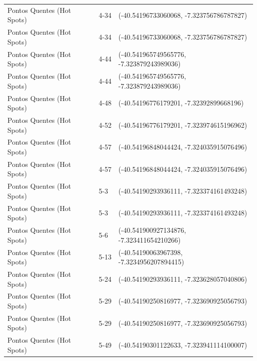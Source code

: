 \documentclass[dvipsnames]{article}%
\begin{document}
\begin{table}[h!]
\begin{tabular}{lll}
Pontos Quentes (Hot Spots)&4{-}34&({-}40.54196733060068, {-}7.323756786787827)\\%
Pontos Quentes (Hot Spots)&4{-}34&({-}40.54196733060068, {-}7.323756786787827)\\%
Pontos Quentes (Hot Spots)&4{-}44&({-}40.541965749565776, {-}7.323879243989036)\\%
Pontos Quentes (Hot Spots)&4{-}44&({-}40.541965749565776, {-}7.323879243989036)\\%
Pontos Quentes (Hot Spots)&4{-}48&({-}40.54196776179201, {-}7.32392899668196)\\%
Pontos Quentes (Hot Spots)&4{-}52&({-}40.54196776179201, {-}7.323974615196962)\\%
Pontos Quentes (Hot Spots)&4{-}57&({-}40.54196848044424, {-}7.324035915076496)\\%
Pontos Quentes (Hot Spots)&4{-}57&({-}40.54196848044424, {-}7.324035915076496)\\%
Pontos Quentes (Hot Spots)&5{-}3&({-}40.54190293936111, {-}7.323374161493248)\\%
Pontos Quentes (Hot Spots)&5{-}3&({-}40.54190293936111, {-}7.323374161493248)\\%
Pontos Quentes (Hot Spots)&5{-}6&({-}40.541900927134876, {-}7.323411654210266)\\%
Pontos Quentes (Hot Spots)&5{-}13&({-}40.54190063967398, {-}7.3234956207894415)\\%
Pontos Quentes (Hot Spots)&5{-}24&({-}40.54190293936111, {-}7.323628057040806)\\%
Pontos Quentes (Hot Spots)&5{-}29&({-}40.54190250816977, {-}7.323690925056793)\\%
Pontos Quentes (Hot Spots)&5{-}29&({-}40.54190250816977, {-}7.323690925056793)\\%
Pontos Quentes (Hot Spots)&5{-}49&({-}40.54190301122633, {-}7.323941114100007)\\%
\bottomrule%
\end{tabular}%
\end{table}

%
\FloatBarrier%
\end{document}
